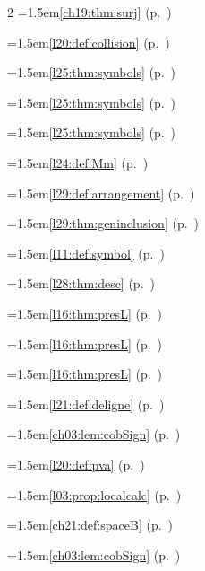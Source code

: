 \begin{multicols}{2}
\hangindent=1.5em\quad \ref{ch19:thm:surj} (p.~\pageref{ch19:thm:surj})\par
\hangindent=1.5em\quad \ref{l20:def:collision} (p.~\pageref{l20:def:collision})\par
\hangindent=1.5em\quad \ref{l25:thm:symbols} (p.~\pageref{l25:thm:symbols})\par
\hangindent=1.5em\quad \ref{l25:thm:symbols} (p.~\pageref{l25:thm:symbols})\par
\hangindent=1.5em\quad \ref{l25:thm:symbols} (p.~\pageref{l25:thm:symbols})\par
\hangindent=1.5em\quad \ref{l24:def:Mm} (p.~\pageref{l24:def:Mm})\par
\hangindent=1.5em\quad \ref{l29:def:arrangement} (p.~\pageref{l29:def:arrangement})\par
\hangindent=1.5em\quad \ref{l29:thm:geninclusion} (p.~\pageref{l29:thm:geninclusion})\par
\hangindent=1.5em\quad \ref{l11:def:symbol} (p.~\pageref{l11:def:symbol})\par
\hangindent=1.5em\quad \ref{l28:thm:desc} (p.~\pageref{l28:thm:desc})\par
\hangindent=1.5em\quad \ref{l16:thm:presL} (p.~\pageref{l16:thm:presL})\par
\hangindent=1.5em\quad \ref{l16:thm:presL} (p.~\pageref{l16:thm:presL})\par
\hangindent=1.5em\quad \ref{l16:thm:presL} (p.~\pageref{l16:thm:presL})\par
\hangindent=1.5em\quad \ref{l21:def:deligne} (p.~\pageref{l21:def:deligne})\par
\hangindent=1.5em\quad \ref{ch03:lem:cobSign} (p.~\pageref{ch03:lem:cobSign})\par
\hangindent=1.5em\quad \ref{l20:def:pva} (p.~\pageref{l20:def:pva})\par
\hangindent=1.5em\quad \ref{l03:prop:localcalc} (p.~\pageref{l03:prop:localcalc})\par
\hangindent=1.5em\quad \ref{ch21:def:spaceB} (p.~\pageref{ch21:def:spaceB})\par
\hangindent=1.5em\quad \ref{ch03:lem:cobSign} (p.~\pageref{ch03:lem:cobSign})\par

\end{multicols}
